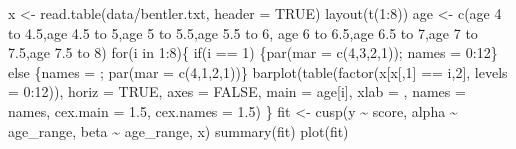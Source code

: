 \documentclass[
  a4paper,
  DIV=11,
  numbers=noendperiod,
  oneside]{scrreprt}
\newenvironment{Shaded}{}{}
\newcommand{\AttributeTok}[1]{\textcolor[rgb]{0.84,0.23,0.29}{#1}}
\newcommand{\ConstantTok}[1]{\textcolor[rgb]{0.00,0.36,0.77}{#1}}
\newcommand{\ControlFlowTok}[1]{\textcolor[rgb]{0.84,0.23,0.29}{#1}}
\newcommand{\DecValTok}[1]{\textcolor[rgb]{0.00,0.36,0.77}{#1}}
\newcommand{\FloatTok}[1]{\textcolor[rgb]{0.00,0.36,0.77}{#1}}
\newcommand{\FunctionTok}[1]{\textcolor[rgb]{0.44,0.26,0.76}{#1}}
\newcommand{\NormalTok}[1]{\textcolor[rgb]{0.14,0.16,0.18}{#1}}
\newcommand{\OtherTok}[1]{\textcolor[rgb]{0.44,0.26,0.76}{#1}}
\newcommand{\SpecialCharTok}[1]{\textcolor[rgb]{0.00,0.36,0.77}{#1}}
\newcommand{\StringTok}[1]{\textcolor[rgb]{0.01,0.18,0.38}{#1}}
\begin{document}
\begin{Shaded}
\begin{Highlighting}[]
\NormalTok{x }\OtherTok{\textless{}{-}} \FunctionTok{read.table}\NormalTok{(}\StringTok{\textquotesingle{}data/bentler.txt\textquotesingle{}}\NormalTok{, }\AttributeTok{header =} \ConstantTok{TRUE}\NormalTok{)}
\FunctionTok{layout}\NormalTok{(}\FunctionTok{t}\NormalTok{(}\DecValTok{1}\SpecialCharTok{:}\DecValTok{8}\NormalTok{))}
\NormalTok{age }\OtherTok{\textless{}{-}} \FunctionTok{c}\NormalTok{(}\StringTok{\textquotesingle{}age 4 to 4.5\textquotesingle{}}\NormalTok{,}\StringTok{\textquotesingle{}age 4.5 to 5\textquotesingle{}}\NormalTok{,}\StringTok{\textquotesingle{}age 5 to 5.5\textquotesingle{}}\NormalTok{,}\StringTok{\textquotesingle{}age 5.5 to 6\textquotesingle{}}\NormalTok{,}
         \StringTok{\textquotesingle{}age 6 to 6.5\textquotesingle{}}\NormalTok{,}\StringTok{\textquotesingle{}age 6.5 to 7\textquotesingle{}}\NormalTok{,}\StringTok{\textquotesingle{}age 7 to 7.5\textquotesingle{}}\NormalTok{,}\StringTok{\textquotesingle{}age 7.5 to 8\textquotesingle{}}\NormalTok{)}
\ControlFlowTok{for}\NormalTok{(i }\ControlFlowTok{in} \DecValTok{1}\SpecialCharTok{:}\DecValTok{8}\NormalTok{)\{}
  \ControlFlowTok{if}\NormalTok{(i }\SpecialCharTok{==} \DecValTok{1}\NormalTok{) \{}\FunctionTok{par}\NormalTok{(}\AttributeTok{mar =} \FunctionTok{c}\NormalTok{(}\DecValTok{4}\NormalTok{,}\DecValTok{3}\NormalTok{,}\DecValTok{2}\NormalTok{,}\DecValTok{1}\NormalTok{)); names }\OtherTok{=} \DecValTok{0}\SpecialCharTok{:}\DecValTok{12}\NormalTok{\} }\ControlFlowTok{else} 
\NormalTok{    \{names }\OtherTok{=} \StringTok{\textquotesingle{}\textquotesingle{}}\NormalTok{; }\FunctionTok{par}\NormalTok{(}\AttributeTok{mar =} \FunctionTok{c}\NormalTok{(}\DecValTok{4}\NormalTok{,}\DecValTok{1}\NormalTok{,}\DecValTok{2}\NormalTok{,}\DecValTok{1}\NormalTok{))\}}
  \FunctionTok{barplot}\NormalTok{(}\FunctionTok{table}\NormalTok{(}\FunctionTok{factor}\NormalTok{(x[x[,}\DecValTok{1}\NormalTok{] }\SpecialCharTok{==}\NormalTok{ i,}\DecValTok{2}\NormalTok{], }\AttributeTok{levels =} \DecValTok{0}\SpecialCharTok{:}\DecValTok{12}\NormalTok{)), }
          \AttributeTok{horiz =} \ConstantTok{TRUE}\NormalTok{, }\AttributeTok{axes =} \ConstantTok{FALSE}\NormalTok{,}
          \AttributeTok{main =}\NormalTok{ age[i], }\AttributeTok{xlab =} \StringTok{\textquotesingle{}\textquotesingle{}}\NormalTok{,}
          \AttributeTok{names =}\NormalTok{ names, }\AttributeTok{cex.main =} \FloatTok{1.5}\NormalTok{, }\AttributeTok{cex.names =} \FloatTok{1.5}\NormalTok{)}
\NormalTok{\}}
\NormalTok{fit }\OtherTok{\textless{}{-}} \FunctionTok{cusp}\NormalTok{(y }\SpecialCharTok{\textasciitilde{}}\NormalTok{ score, alpha }\SpecialCharTok{\textasciitilde{}}\NormalTok{ age\_range, beta }\SpecialCharTok{\textasciitilde{}}\NormalTok{ age\_range, x)}
\FunctionTok{summary}\NormalTok{(fit)}
\FunctionTok{plot}\NormalTok{(fit)}
\end{Highlighting}
\end{Shaded}
\end{document}
